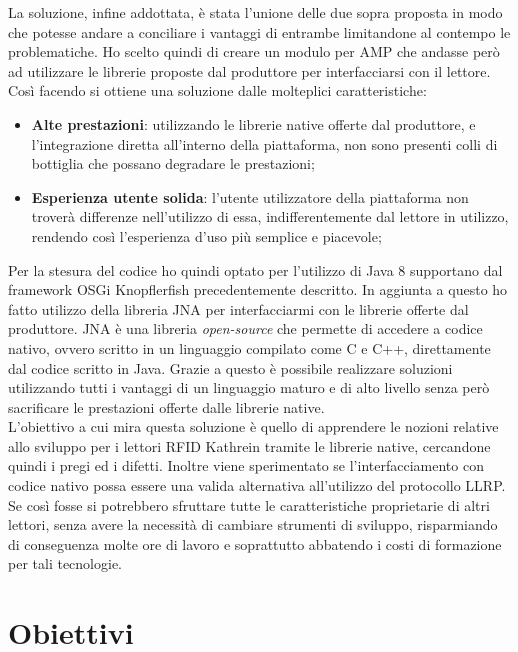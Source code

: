 La soluzione, infine addottata, è stata l'unione delle due sopra proposta in modo che potesse andare a conciliare i vantaggi di entrambe limitandone al
contempo le problematiche. Ho scelto quindi di creare un modulo per AMP che andasse però ad utilizzare le librerie proposte dal produttore per interfacciarsi
con il lettore. Così facendo si ottiene una soluzione dalle molteplici caratteristiche:
\begin{itemize}
    \item \textbf{Alte prestazioni}: utilizzando le librerie native offerte dal produttore, e l'integrazione diretta all'interno della piattaforma, non sono presenti
    colli di bottiglia che possano degradare le prestazioni;
    \item \textbf{Esperienza utente solida}: l'utente utilizzatore della piattaforma non troverà differenze nell'utilizzo di essa, indifferentemente dal lettore in utilizzo, 
    rendendo così l'esperienza d'uso più semplice e piacevole; 
\end{itemize}
Per la stesura del codice ho quindi optato per l'utilizzo di Java 8 supportano dal framework OSGi Knopflerfish precedentemente descritto. In aggiunta a questo
ho fatto utilizzo della libreria JNA per interfacciarmi con le librerie offerte dal produttore. JNA è una libreria \emph{open-source} che permette di accedere
a codice nativo, ovvero scritto in un linguaggio compilato come C e C++, direttamente dal codice scritto in Java. Grazie a questo è possibile realizzare
soluzioni utilizzando tutti i vantaggi di un linguaggio maturo e di alto livello senza però sacrificare le prestazioni offerte dalle librerie native. \\
L'obiettivo a cui mira questa soluzione è quello di apprendere le nozioni relative allo sviluppo per i lettori RFID Kathrein tramite le librerie native, cercandone
quindi i pregi ed i difetti. Inoltre viene sperimentato se l'interfacciamento con codice nativo possa essere una valida alternativa all'utilizzo
del protocollo LLRP. Se così fosse si potrebbero sfruttare tutte le caratteristiche proprietarie di altri lettori, senza avere la necessità di cambiare strumenti
di sviluppo, risparmiando di conseguenza molte ore di lavoro e soprattutto abbatendo i costi di formazione per tali tecnologie.


\section{Obiettivi}

